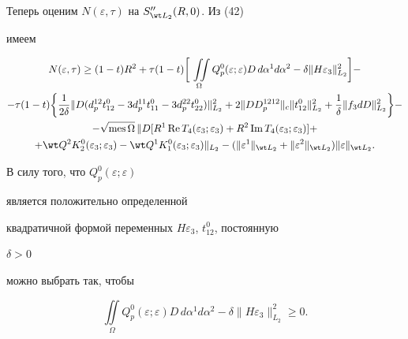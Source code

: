 \begin{pf}
\begin{equation}
\end{equation} 


Теперь оценим $N(\varepsilon,\tau)$ на $S''_{\wt L_2}(R,0)$. Из (42) 


имеем 


\begin{multline} 


N(\varepsilon,\tau)\ge(1-t)R^2+\tau(1-t)\bigg[\,\iint\limits_\Omega 


Q^0_p(\varepsilon;\varepsilon)D\,d\alpha^1d\alpha^2-\delta 


\|H\varepsilon_3\|^2_{L_2}\bigg]- \\ 


% 


-\tau(1-t)\bigg\{\frac{1}{2\delta}\|D(d^{12}_p t^0_{12}-3d^{11}_p 


t^0_{11}-3d^{22}_p t^0_{22})\|^2_{L_2}+2\|D D^{1212}_p\|_c 


\|t^0_{12}\|^2_{L_2}+\frac{1}{\delta}\|f_3d D\|^2_{L_2}\bigg\}- \\ 


% 


- \sqrt{\mes\Omega}\,\|D[R^1\re T_4(\varepsilon_3;\varepsilon_3)+ 


R^2\im T_4(\varepsilon_3;\varepsilon_3)]+ \\ 


% 


+ \wt Q^2K^0_2(\varepsilon_3;\varepsilon_3)- 


\wt Q^1K^0_1(\varepsilon_3;\varepsilon_3)\|_{L_2}- 


(\|\varepsilon^1\|_{\wt L_2}+\|\varepsilon^2\|_{\wt L_2}) 


\|\varepsilon\|_{\wt L_2}. 


\end{multline} 


В силу того, что $Q^0_p(\varepsilon;\varepsilon)$ 


является положительно определенной 


квадратичной формой переменных $H\varepsilon_3$, $t^0_{12}$, постоянную 


$\delta>0$ 


можно выбрать так, чтобы 


\begin{equation} 


\iint\limits_\Omega Q^0_p(\varepsilon;\varepsilon)D\, 


d\alpha^1d\alpha^2-\delta\|H\varepsilon_3\|^2_{L_2}\ge 0. 


\end{equation} 



\end{pf}
